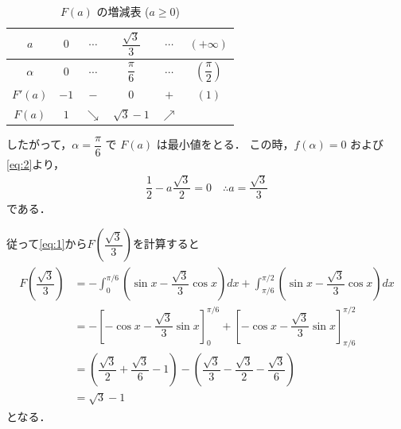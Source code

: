 \documentclass[../../main.tex]{subfiles}
\begin{document}
\begin{table}[htb]
  \centering
  \caption{$F(a)$ の増減表 ($a \ge 0$)}
  \begin{tabular}{c|ccccc}
    $a$ & $0$ & $\cdots$ & $\dfrac{\sqrt{3}}{3}$ & $\cdots$ & $(+\infty)$ \\
    \hline
    $\alpha$ & $0$ & $\cdots$ & $\dfrac{\pi}{6}$ & $\cdots$ & $\left(\dfrac{\pi}{2}\right)$ \\
    \hline
    $F'(a)$ & $-1$ & $-$ & $0$ & $+$ & $(1)$ \\
    \hline
    $F(a)$ & $1$ & $\searrow$ & $\sqrt{3}-1$ & $\nearrow$ &
  \end{tabular}
\end{table}

したがって，$\alpha=\dfrac{\pi}{6}$ で $F(a)$ は最小値をとる．
この時，$f(\alpha)=0$ および\cref{eq:2}より，
\begin{align}
  \dfrac{1}{2} - a \dfrac{\sqrt{3}}{2} = 0 \quad \therefore a = \dfrac{\sqrt{3}}{3} \label{eq:6}
\end{align}
である．

従って\cref{eq:1}から$F\left(\dfrac{\sqrt{3}}{3}\right)$を計算すると
\begin{align}
  \begin{split}
    F\left(\dfrac{\sqrt{3}}{3}\right)
    &= -\int_0^{\pi/6}\left(\sin x-\dfrac{\sqrt{3}}{3}\cos x\right)dx+\int_{\pi/6}^{\pi/2}\left(\sin x-\dfrac{\sqrt{3}}{3}\cos x\right)dx \\
    &= -\left[-\cos x-\dfrac{\sqrt{3}}{3}\sin x\right]_0^{\pi/6}+\left[-\cos x-\dfrac{\sqrt{3}}{3}\sin x\right]_{\pi/6}^{\pi/2} \\
    &= \left(\dfrac{\sqrt{3}}{2}+\dfrac{\sqrt{3}}{6}-1\right)-\left(\dfrac{\sqrt{3}}{3}-\dfrac{\sqrt{3}}{2}-\dfrac{\sqrt{3}}{6}\right) \\
    &= \sqrt{3}-1
  \end{split}
\end{align}
となる．
\end{document}
